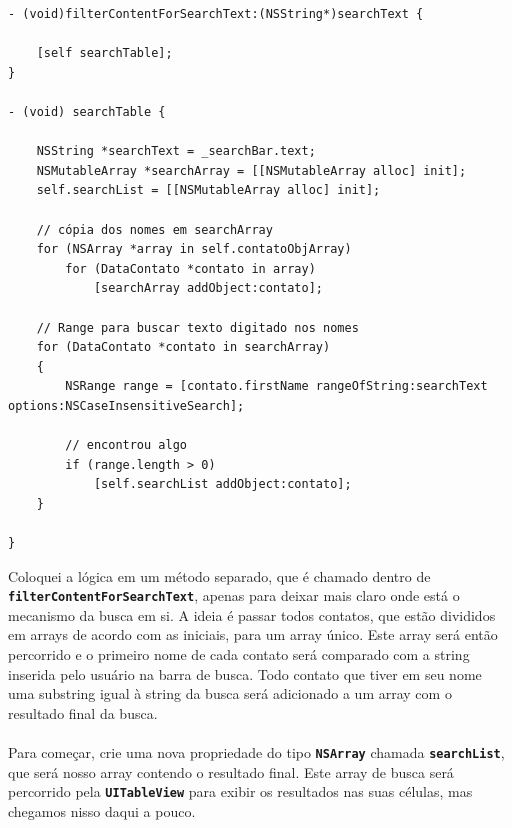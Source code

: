 \documentclass[a4paper,12pt,brazil,doubleside]{book}
\begin{document}
\begin{listing}
\begin{verbatim}
- (void)filterContentForSearchText:(NSString*)searchText {
    
    [self searchTable];
}

- (void) searchTable {
    
    NSString *searchText = _searchBar.text;
    NSMutableArray *searchArray = [[NSMutableArray alloc] init];
    self.searchList = [[NSMutableArray alloc] init];
    
    // cópia dos nomes em searchArray
    for (NSArray *array in self.contatoObjArray)
        for (DataContato *contato in array)
            [searchArray addObject:contato];
    
    // Range para buscar texto digitado nos nomes
    for (DataContato *contato in searchArray)
    {
        NSRange range = [contato.firstName rangeOfString:searchText options:NSCaseInsensitiveSearch];
        
        // encontrou algo
        if (range.length > 0)
            [self.searchList addObject:contato];
    }
    
}
\end{verbatim}
\end{listing}

Coloquei a lógica em um método separado, que é chamado dentro de \texttt{\textbf{filterContentForSearchText}}, apenas para deixar mais claro onde está o mecanismo da busca em si.
A ideia é passar todos contatos, que estão divididos em arrays de acordo com as iniciais, para um array único. Este array será então percorrido e o primeiro nome de cada contato será comparado com a string inserida pelo usuário na barra de busca. Todo contato que tiver em seu nome uma substring igual à string da busca será adicionado a um array com o resultado final da busca.
\paragraph{}Para começar, crie uma nova propriedade do tipo \texttt{\textbf{NSArray}} chamada \texttt{\textbf{searchList}}, que será nosso array contendo o resultado final. Este array de busca será percorrido pela \texttt{\textbf{UITableView}} para exibir os resultados nas suas células, mas chegamos nisso daqui a pouco.
\end{document}

